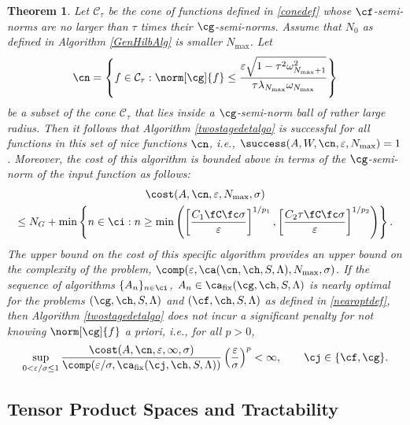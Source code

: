 \documentclass[final]{elsarticle}
\newcommand{\cc}{\mathcal{C}}
\newtheorem{theorem}{Theorem}
\theoremstyle{definition}
\theoremstyle{remark}
\DeclareMathOperator{\fix}{fix}
\begin{document}
\begin{theorem}
Let $\cc_\tau$ be the cone of functions defined in \eqref{conedef} whose $\cf$-semi-norms are no larger than $\tau$ times their $\cg$-semi-norms.  Assume that $N_0$ as defined in Algorithm \ref{GenHilbAlg} is smaller $N_{\max}$.  Let
\begin{equation} \label{nicefHilbdef}
\cn = \left \{ f \in \cc_\tau : \norm[\cg]{f} \le \frac{\varepsilon \sqrt{1 - \tau^2 \omega_{N_{\max}+1}^2}}{\tau \lambda_{N_{\max}} \omega_{N_{\max}}} \right\}
\end{equation}
be a subset of the cone $\cc_\tau$ that lies inside a $\cg$-semi-norm ball of rather large radius.  Then it follows that Algorithm \ref{twostagedetalgo} is successful for all functions in this set of \emph{nice} functions $\cn$,  i.e.,  $\success(A,W,\cn,\varepsilon,N_{\max}) = 1$.  Moreover, the cost of this algorithm is bounded above in terms of the $\cg$-semi-norm of the input function as follows:
\begin{multline} \label{auto2stagedetcost}
\cost(A,\cn,\varepsilon,N_{\max},\sigma) \\
\le N_G+ \min\left\{ n \in \ci : n \ge \min\left( \left[\frac{C_1 \fC \fc \sigma }{\varepsilon}\right]^{1/p_1}, \left[\frac{C_2 \tau \fC \fc \sigma}{\varepsilon}\right]^{1/p_2} \right ) \right\}.
\end{multline}
The upper bound on the cost of this specific algorithm provides an upper bound on the complexity of the problem, $\comp(\varepsilon,\ca(\cn,\ch,S,\Lambda),N_{\max},\sigma)$.  If the sequence of algorithms $\{A_n\}_{n \in \ci}$, $A_n \in\ca_{\fix}(\cg,\ch,S,\Lambda)$  is nearly optimal for the problems $(\cg,\ch,S,\Lambda)$ and $(\cf,\ch,S,\Lambda)$ as defined in \eqref{nearoptdef}, then Algorithm \ref{twostagedetalgo} does not incur a significant penalty for not knowing $\norm[\cg]{f}$ a priori, i.e., for all $p>0$,
\begin{equation*}
\sup_{0 < \varepsilon/\sigma \le 1} \frac{\cost(A,\cn,\varepsilon,\infty,\sigma)} {\comp(\varepsilon/\sigma,\ca_{\fix}(\cj,\ch,S,\Lambda))} \left(\frac{\varepsilon}{\sigma}\right)^p <\infty, \qquad \cj \in \{\cf,\cg\}.
\end{equation*}

\end{theorem}

\subsection{Tensor Product Spaces and Tractability}
\end{document}
